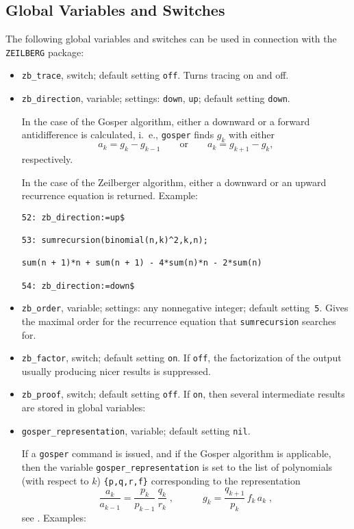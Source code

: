 \subsection{Global Variables and Switches}
The following global variables and switches can be used in connection with
the {\tt ZEILBERG} package:
\begin{itemize}
\item
{\tt zb\verb+_+trace}, switch; default setting {\tt off}. 
Turns tracing on and off.
\item
{\tt zb\verb+_+direction}, variable; settings: {\tt down}, {\tt up};
default setting {\tt down}. 

In the case of the Gosper algorithm, either a downward or a forward
antidifference is calculated, i.\ e., {\tt gosper} finds $g_k$ with either
\[
a_k=g_k-g_{k-1}
\quad\quad\mbox{or}\quad\quad
a_k=g_{k+1}-g_{k},
\]
respectively.

In the case of the Zeilberger algorithm, either a downward or an upward
recurrence equation is returned. Example:

{\small
\begin{verbatim}
52: zb_direction:=up$

53: sumrecursion(binomial(n,k)^2,k,n);

sum(n + 1)*n + sum(n + 1) - 4*sum(n)*n - 2*sum(n)

54: zb_direction:=down$
\end{verbatim}
}\noindent
\item
{\tt zb\verb+_+order}, variable; settings: any nonnegative integer;
default setting~{\tt 5}. 
Gives the maximal order for the recurrence
equation that {\tt sumrecursion} searches for.
\item
{\tt zb\verb+_+factor}, switch; default setting {\tt on}.
If {\tt off}, the factorization of the output usually producing nicer results
is suppressed.
\item
{\tt zb\verb+_+proof}, switch; default setting {\tt off}. If {\tt on},
then several intermediate results are stored in global variables:
\item
{\tt gosper\verb+_+representation}, variable; default setting {\tt nil}.

If a {\tt gosper} command is issued, and if the Gosper algorithm is applicable,
then the variable {\tt gosper\verb+_+representation} is set to the
list of polynomials (with respect to $k$) {\tt \{p,q,r,f\}}
corresponding to the representation
\[
\frac{a_k}{a_{k-1}}=\frac{p_k}{p_{k-1}}\,\frac{q_k}{r_k}
\;,
\quad\quad\quad
g_k=\frac{q_{k+1}}{p_k}\,f_k\,a_k
\;,
\]
see \cite{Gos}. Examples:


\end{itemize}
